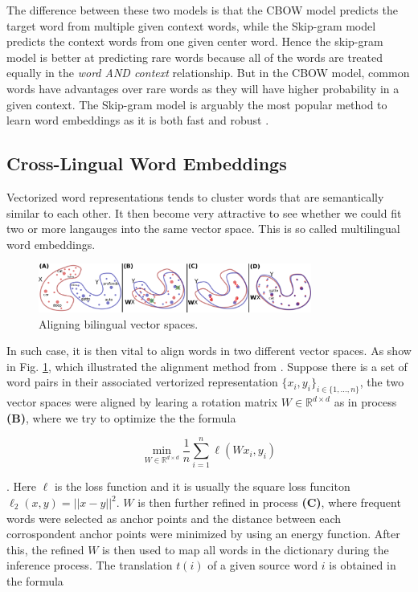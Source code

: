 \documentclass[thesis,fonts=libertine]{cluu}
\begin{document}
The difference between these two models is that the CBOW model predicts the target word from multiple given context words, while the Skip-gram model predicts the context words from one given center word. Hence the skip-gram model is better at predicting rare words because all of the words are treated equally in the \textit{word AND context} relationship. But in the CBOW model, common words have advantages over rare words as they will have higher probability in a given context. The Skip-gram model is arguably the most popular method to learn word embeddings as it is both fast and robust \parencite{levy-etal-2015-improving}.

\subsection{Cross-Lingual Word Embeddings}

Vectorized word representations tends to cluster words that are semantically similar to each other. It then become very attractive to see whether we could fit two or more langauges into the same vector space. This is so called multilingual word embeddings.

\begin{figure}
  \label{fig:vec_space_align}
  \centering
  \includegraphics[width=0.8\textwidth]{vector_spaces_alignment.png}
  \caption{Aligning bilingual vector spaces. \parencite{Conneau:2017aa}}
\end{figure}

In such case, it is then vital to align words in two different vector spaces. As show in Fig. \ref{fig:vec_space_align}, which illustrated the alignment method from \cite{Conneau:2017aa}. Suppose there is a set of word pairs in their associated vertorized representation $\{x_i, y_i\}_{i\in \{1, ..., n\}}$, the two vector spaces were aligned by learing a rotation matrix $W \in \mathbb{R}^{d \times d}$ as in process \textbf{(B)}, where we try to optimize the the formula 

\begin{equation}
  \min_{W \in \mathbb{R}^{d \times d}} \frac{1}{n}\sum_{i=1}^n \ell(Wx_i, y_i)
\end{equation}

. Here $\ell$ is the loss function and it is usually the square loss funciton $\ell_2(x, y)=||x-y||^2$. $W$ is then further refined in process \textbf{(C)}, where frequent words were selected as anchor points and the distance between each corrospondent anchor points were minimized by using an energy function. After this, the refined $W$ is then used to map all words in the dictionary during the inference process. The translation $t(i)$ of a given source word $i$ is obtained in the formula
\end{document}

